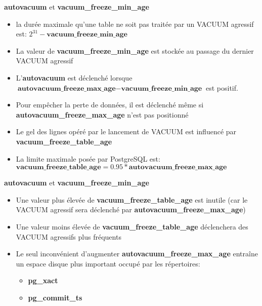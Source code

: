 
\begin{frame}{\textbf{autovacuum} et \textbf{vacuum\_freeze\_min\_age}}

\begin{itemize}
   \item la durée maximale qu'une table ne soit pas traitée par un VACUUM agressif est: $2^{31} - \textbf{vacuum\_freeze\_min\_age}$
   \item La valeur de \textbf{vacuum\_freeze\_min\_age} est stockée au passage du dernier VACUUM agressif
   \item L'\textbf{autovacuum} est déclenché lorsque $\textbf{autovacuum\_freeze\_max\_age} - \textbf{vacuum\_freeze\_min\_age}$ est positif.
   \item Pour empêcher la perte de données, il est déclenché même si \textbf{autovacuum\_freeze\_max\_age} n'est pas positionné
   \item Le gel des lignes opéré par le lancement de VACUUM est influencé par \textbf{vacuum\_freeze\_table\_age}
   \item La limite maximale posée par PostgreSQL est: $\textbf{vacuum\_freeze\_table\_age} = 0.95 * \textbf{autovacuum\_freeze\_max\_age}$
\end{itemize}

\end{frame}


\begin{frame}{\textbf{autovacuum} et \textbf{vacuum\_freeze\_min\_age}}

\begin{itemize}
   \item Une valeur plus élevée de \textbf{vacuum\_freeze\_table\_age} est inutile (car le VACUUM agressif sera déclenché par \textbf{autovacuum\_freeze\_max\_age})
   \item Une valeur moins élevée de \textbf{vacuum\_freeze\_table\_age} déclenchera des VACUUM agressifs plus fréquents
   \item Le seul inconvénient d'augmenter \textbf{autovacuum\_freeze\_max\_age} entraîne un espace disque plus important occupé par les répertoires: 
      \begin{itemize}
         \item \textbf{pg\_xact}
         \item \textbf{pg\_commit\_ts}
      \end{itemize}
\end{itemize}

\begin{toile}
\end{toile}

\end{frame}

